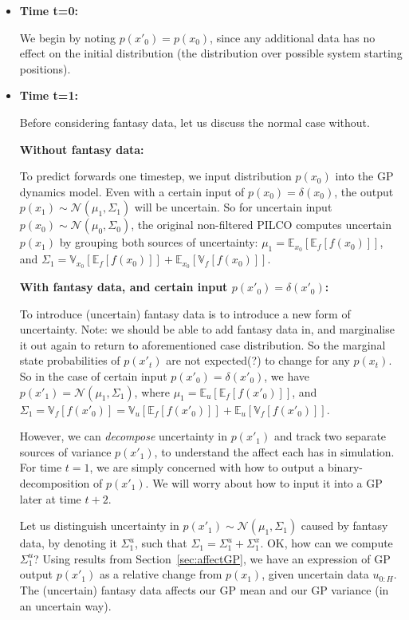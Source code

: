 \documentclass[a4paper,10pt]{article}
\newcommand{\N}{\mathcal{N}}
\newcommand{\E}{\mathbb{E}}
\newcommand{\V}{\mathbb{V}}
\begin{document}
\begin{itemize}
 \item \textbf{Time t=0:}

 We begin by noting $p(x'_0) = p(x_0)$,
 since any additional data has no effect on the initial distribution
 (the distribution over possible system starting positions).
 \item \textbf{Time t=1:}

 Before considering fantasy data, let us discuss the normal case without.

 \textbf{Without fantasy data:}

 To predict forwards one timestep,
 we input distribution $p(x_0)$ into the GP dynamics model.
 Even with a certain input of $p(x_0)=\delta(x_0)$,
 the output $p(x_1)\sim\N(\mu_1,\Sigma_1)$ will be uncertain.
 So for uncertain input $p(x_0)\sim\N(\mu_0,\Sigma_0)$, the original non-filtered PILCO
 computes uncertain $p(x_1)$
 by grouping both sources of uncertainty:
 $\mu_1 = \E_{x_0}[\E_f[f(x_0)]]$, and
 $\Sigma_1 = \V_{x_0}[\E_f[f(x_0)]] + \E_{x_0}[\V_f[f(x_0)]]$.

 \textbf{With fantasy data, and certain input $p(x'_0)=\delta(x'_0)$:}

 To introduce (uncertain) fantasy data is to introduce a new form of uncertainty.
 Note: we should be able to add fantasy data in,
 and marginalise it out again to
 return to aforementioned case distribution.
 So the marginal state probabilities of $p(x'_t)$ are not expected(?) to change for any $p(x_t)$.
 So in the case of certain input $p(x'_0)=\delta(x'_0)$,
 we have $p(x'_1)=\N(\mu_1,\Sigma_1)$,
 where $\mu_1 = \E_u[\E_f[f(x'_0)]]$,
 and $\Sigma_1 = \V_f[f(x'_0)] = \V_u[\E_f[f(x'_0)]] + \E_u[\V_f[f(x'_0)]]$.

 However, we can \textit{decompose} uncertainty in $p(x'_1)$
 and track two separate sources of variance $p(x'_1)$,
 to understand the affect each has in simulation.
 For time $t=1$, we are simply concerned with how to output a binary-decomposition
 of $p(x'_1)$. We will worry about how to input it into a GP later at time $t+2$.

 Let us distinguish uncertainty in $p(x'_1)\sim\N(\mu_1,\Sigma_1)$ caused by fantasy data,  %
 by denoting it $\Sigma^{u}_1$,
 such that $\Sigma_1 = \Sigma^{u}_1 + \Sigma^{x}_1$.
 OK, how can we compute $\Sigma^{u}_1$?
 Using results from Section~\ref{sec:affectGP},
 we have an expression of GP output $p(x'_1)$ as a relative change from $p(x_1)$,
 given uncertain data $u_{0:H}$.
 The (uncertain) fantasy data affects our GP mean and our GP variance (in an uncertain way).


\end{itemize}
\end{document}
